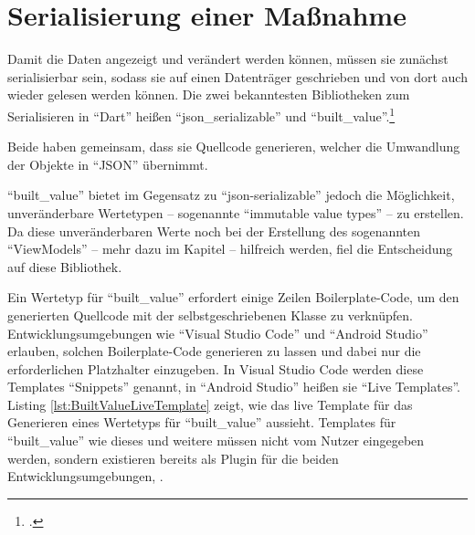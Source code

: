 

\section{Serialisierung einer Maßnahme}

Damit die Daten angezeigt und verändert werden können, müssen sie zunächst serialisierbar sein, sodass sie auf einen Datenträger geschrieben und von dort auch wieder gelesen werden können.
Die zwei bekanntesten Bibliotheken zum Serialisieren in \enquote{Dart} heißen \enquote{json_serializable} und \enquote{built_value}.\footcite[Vgl.][]{JSONAndSerialization}


Beide haben gemeinsam, dass sie Quellcode generieren, welcher die Umwandlung der Objekte in \enquote{JSON} übernimmt.


\enquote{built_value} bietet im Gegensatz zu \enquote{json-serializable} jedoch die Möglichkeit, unveränderbare Wertetypen -- sogenannte \enquote{immutable value types} -- zu erstellen.
Da diese unveränderbaren Werte noch bei der Erstellung des sogenannten \enquote{ViewModels} --  mehr dazu im Kapitel  -- hilfreich werden,
fiel die Entscheidung auf diese Bibliothek.

Ein Wertetyp für \enquote{built_value} erfordert einige Zeilen Boilerplate-Code, um den generierten Quellcode mit der selbstgeschriebenen Klasse zu verknüpfen.
Entwicklungsumgebungen wie \enquote{Visual Studio Code} und \enquote{Android Studio} erlauben, solchen Boilerplate-Code generieren zu lassen und dabei nur die erforderlichen Platzhalter einzugeben.
In Visual Studio Code werden diese Templates \enquote{Snippets} genannt, in \enquote{Android Studio} heißen sie \enquote{Live Templates}.
 Listing \ref{lst:BuiltValueLiveTemplate} zeigt, wie das live Template für das Generieren eines Wertetyps  für \enquote{built_value} aussieht.
Templates für \enquote{built_value} wie dieses und weitere müssen nicht vom Nutzer eingegeben werden,
sondern existieren bereits als Plugin für die beiden Entwicklungsumgebungen, .


